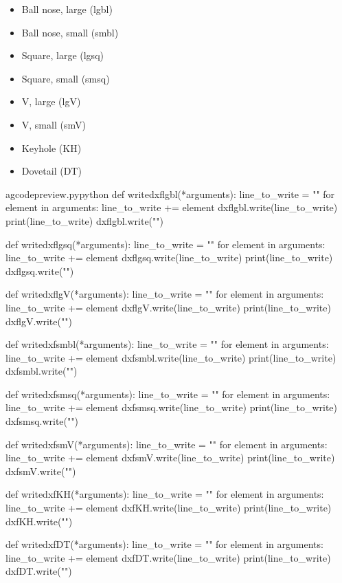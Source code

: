 \documentclass{ltxdoc}
\begin{document}
\begin{itemize}
\item Ball nose, large (lgbl)
\item Ball nose, small (smbl)
\item Square, large (lgsq)
\item Square, small (smsq)
\item V, large (lgV)
\item V, small (smV)
\item Keyhole (KH)
\item Dovetail (DT)
\end{itemize}
 
\lstset{firstnumber=\thegcpy}
\begin{writecode}{a}{gcodepreview.py}{python}
def writedxflgbl(*arguments):
    line_to_write = ""
    for element in arguments:
        line_to_write += element
    dxflgbl.write(line_to_write)
    print(line_to_write)
    dxflgbl.write("\n")

def writedxflgsq(*arguments):
    line_to_write = ""
    for element in arguments:
        line_to_write += element
    dxflgsq.write(line_to_write)
    print(line_to_write)
    dxflgsq.write("\n")

def writedxflgV(*arguments):
    line_to_write = ""
    for element in arguments:
        line_to_write += element
    dxflgV.write(line_to_write)
    print(line_to_write)
    dxflgV.write("\n")

def writedxfsmbl(*arguments):
    line_to_write = ""
    for element in arguments:
        line_to_write += element
    dxfsmbl.write(line_to_write)
    print(line_to_write)
    dxfsmbl.write("\n")

def writedxfsmsq(*arguments):
    line_to_write = ""
    for element in arguments:
        line_to_write += element
    dxfsmsq.write(line_to_write)
    print(line_to_write)
    dxfsmsq.write("\n")

def writedxfsmV(*arguments):
    line_to_write = ""
    for element in arguments:
        line_to_write += element
    dxfsmV.write(line_to_write)
    print(line_to_write)
    dxfsmV.write("\n")

def writedxfKH(*arguments):
    line_to_write = ""
    for element in arguments:
        line_to_write += element
    dxfKH.write(line_to_write)
    print(line_to_write)
    dxfKH.write("\n")

def writedxfDT(*arguments):
    line_to_write = ""
    for element in arguments:
        line_to_write += element
    dxfDT.write(line_to_write)
    print(line_to_write)
    dxfDT.write("\n")

\end{writecode}
\addtocounter{gcpy}{64}
%
 
\end{document}
